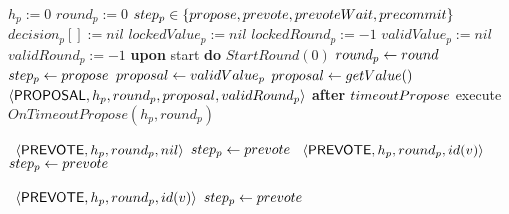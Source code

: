 \begin{algorithm}[htb!] \def\baselinestretch{1} \scriptsize\raggedright
	\begin{algorithmic}[1] 
		\SHORTSPACE 
		\INIT{} 
		\STATE $h_p := 0$  
		\STATE $round_p := 0$   
		\STATE $step_p  \in \left\{propose, prevote, prevoteWait, precommit\right\}$
		\STATE $decision_p[] := nil$ 
		\STATE $lockedValue_p := nil$ 
		\STATE $lockedRound_p := -1$ 
		\STATE $validValue_p := nil$ 
		\STATE $validRound_p := -1$ 
		\ENDINIT 
		\SHORTSPACE 
		\STATE \textbf{upon} start \textbf{do} $StartRound(0)$ 
		\SHORTSPACE 
		 \label{line:tab:startRound} 
		\STATE $round_p \leftarrow round$ 
		\STATE $step_p \leftarrow propose$ 
		 \label{line:tab:isThereLockedValue}
		\STATE $proposal \leftarrow validValue_p$ \ELSE \STATE $proposal \leftarrow
		getValue()$ 
		\label{line:tab:getValidValue} 
		\ENDIF 	  
		\STATE \Broadcast\ $\langle\mathsf{PROPOSAL},h_p, round_p, proposal, validRound_p\rangle$
		\label{line:tab:send-proposal} 
		\ELSE 
		\STATE \textbf{after} $timeoutPropose$ execute $OnTimeoutPropose(h_p,
		round_p)$
		\ENDIF
		\ENDFUNCTION
		
		\SPACE 
		 \label{line:tab:recvProposal}
			\label{line:tab:acceptProposal1}		
				\STATE \Broadcast \ $\langle\mathsf{PREVOTE},h_p,round_p,nil\rangle$  
				\label{line:tab:prevote-nil}	
				\STATE $step_p \leftarrow prevote$ \label{line:tab:setStateToPrevote1} 
			\label{line:tab:accept-proposal-2} 
				\STATE \Broadcast \ $\langle\mathsf{PREVOTE},h_p,round_p,id(v)\rangle$  
				\label{line:tab:prevote-proposal}	
				\STATE $step_p \leftarrow prevote$ \label{line:tab:setStateToPrevote2} 
			\ENDIF
		\ENDUPON
		
		\SPACE 
		\label{line:tab:acceptProposal} 
		 \label{line:tab:cond-prevote-higher-proposal}	
			\STATE \Broadcast \ $\langle\mathsf{PREVOTE},h_p,round_p,id(v)\rangle$
		\label{line:tab:prevote-higher-proposal}	
		\STATE $step_p \leftarrow prevote$ \label{line:tab:setStateToPrevote3} 		 
		\ENDIF 
		\ENDUPON
		

\end{algorithmic}
\end{algorithm}
